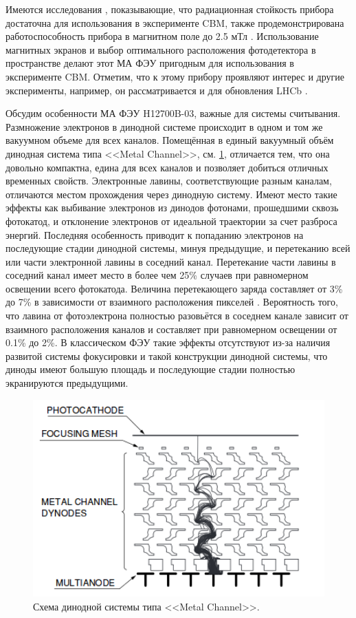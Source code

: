 Имеются исследования \cite{}, показывающие, что радиационная стойкость прибора достаточна для использования в эксперименте CBM, также продемонстрирована работоспособность прибора в магнитном поле до 2.5 мТл \cite{}. Использование магнитных экранов и выбор оптимального расположения фотодетектора в пространстве делают этот МА ФЭУ пригодным для использования в эксперименте CBM. Отметим, что к этому прибору проявляют интерес и другие эксперименты, например, он рассматривается и для обновления LHCb \cite{}.

Обсудим особенности МА ФЭУ H12700B-03, важные для системы считывания. Размножение электронов в динодной системе происходит в одном и том же вакуумном объеме для всех каналов. Помещённая в единый вакуумный объём динодная система типа <<Metal Channel>>, см. \ref{fig:MetalChannel}, отличается тем, что она довольно компактна, едина для всех каналов и позволяет добиться отличных временных свойств. Электронные лавины, соответствующие разным каналам, отличаются местом прохождения через динодную систему. Имеют место такие эффекты как выбивание электронов из динодов фотонами, прошедшими сквозь фотокатод, и отклонение электронов от идеальной траектории за счет разброса энергий. Последняя особенность приводит к попаданию электронов на последующие стадии динодной системы, минуя предыдущие, и перетеканию всей или части электронной лавины в соседний канал. Перетекание части лавины в соседний канал имеет место в более чем 25\% случаев при равномерном освещении всего фотокатода. Величина перетекающего заряда составляет от 3\% до 7\% в зависимости от взаимного расположения пикселей \cite{}. Вероятность того, что лавина от фотоэлектрона полностью разовьётся в соседнем канале зависит от взаимного расположения каналов и составляет при равномерном освещении от 0.1\% до 2\%. В классическом ФЭУ такие эффекты отсутствуют из-за наличия развитой системы фокусировки и такой конструкции динодной системы, что диноды имеют большую площадь и последующие стадии полностью экранируются предыдущими.

\begin{figure}
\includegraphics[width=1.0\textwidth]{pictures/2_Metal_channel.png}
\caption{Схема динодной системы типа <<Metal Channel>>.}
\label{fig:MetalChannel}
\end{figure}

